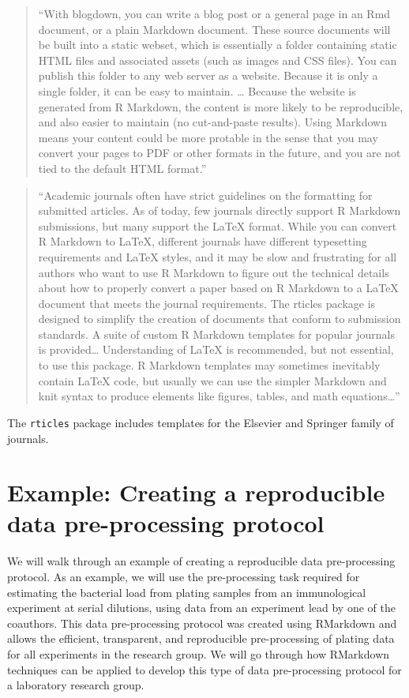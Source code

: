 \documentclass[]{tufte-book}
\begin{document}
\begin{quote}
``With blogdown, you can write a blog post or a general page in an Rmd
document, or a plain Markdown document. These source documents will be
built into a static webset, which is essentially a folder containing static
HTML files and associated assets (such as images and CSS files). You
can publish this folder to any web server as a website. Because it is
only a single folder, it can be easy to maintain. \ldots{} Because the website
is generated from R Markdown, the content is more likely to be reproducible,
and also easier to maintain (no cut-and-paste results). Using Markdown
means your content could be more protable in the sense that you may convert
your pages to PDF or other formats in the future, and you are not tied to the
default HTML format.'' \citep{xie2018r}
\end{quote}

\begin{quote}
``Academic journals often have strict guidelines on the formatting for
submitted articles. As of today, few journals directly support R
Markdown submissions, but many support the LaTeX format. While you can
convert R Markdown to LaTeX, different journals have different
typesetting requirements and LaTeX styles, and it may be slow and
frustrating for all authors who want to use R Markdown to figure out
the technical details about how to properly convert a paper based on
R Markdown to a LaTeX document that meets the journal requirements. The
rticles package is designed to simplify the creation of documents that
conform to submission standards. A suite of custom R Markdown templates
for popular journals is provided\ldots{} Understanding of LaTeX is recommended,
but not essential, to use this package. R Markdown templates may sometimes
inevitably contain LaTeX code, but usually we can use the simpler Markdown
and knit syntax to produce elements like figures, tables, and
math equations\ldots{}'' \citep{xie2018r}
\end{quote}

The \texttt{rticles} package includes templates for the Elsevier and Springer
family of journals.

\hypertarget{module20}{%
\section{Example: Creating a reproducible data pre-processing protocol}\label{module20}}

We will walk through an example of creating a reproducible data pre-processing
protocol. As an example, we will use the pre-processing task required for
estimating the bacterial load from plating samples from an immunological
experiment at serial dilutions, using data from an experiment lead by one of the
coauthors. This data pre-processing protocol was created using RMarkdown and
allows the efficient, transparent, and reproducible pre-processing of plating
data for all experiments in the research group. We will go through how RMarkdown
techniques can be applied to develop this type of data pre-processing protocol
for a laboratory research group.
\end{document}
